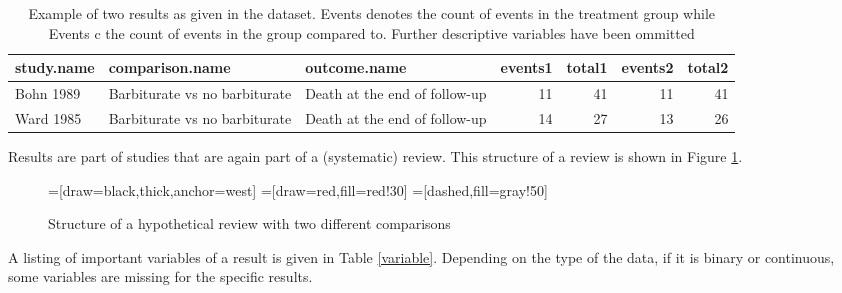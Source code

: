 \documentclass[11pt,a4paper,twoside]{book}\usepackage[]{graphicx}\usepackage[]{color}
\begin{document}
\begin{table}[ht]
\centering
\begingroup\scriptsize
\begin{tabular}{lllrrrr}
  \hline
study.name & comparison.name & outcome.name & events1 & total1 & events2 & total2 \\ 
  \hline
Bohn 1989 & Barbiturate vs no barbiturate & Death at the end of follow-up & 11 & 41 & 11 & 41 \\ 
  Ward 1985 & Barbiturate vs no barbiturate & Death at the end of follow-up & 14 & 27 & 13 & 26 \\ 
   \hline
\end{tabular}
\endgroup
\caption{Example of two results as given in the dataset. Events denotes the count of events in the treatment group while Events c the count of events in the group compared to. Further descriptive variables have been ommitted} 
\label{barbiturate.row}
\end{table}



Results are part of studies that are again part of a (systematic) review. This structure of a review is shown in Figure \ref{review.structure}. 

\begin{figure}
=[draw=black,thick,anchor=west]
=[draw=red,fill=red!30]
=[dashed,fill=gray!50]
\caption{Structure of a hypothetical review with two different comparisons}
\label{review.structure}
\end{figure}

A listing of important variables of a result is given in Table \ref{variable}. Depending on the type of the data, \eg if it is binary or continuous, some variables are missing for the specific results.
\end{document}
